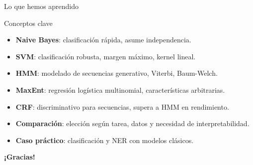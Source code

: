 \documentclass[aspectratio=169, 10pt, xcolor=table]{beamer}
\begin{document}
\begin{frame}{Lo que hemos aprendido}
    \begin{exampleblock}{Conceptos clave}
        \begin{itemize}
            \item \textbf{Naive Bayes}: clasificación rápida, asume independencia.
            \item \textbf{SVM}: clasificación robusta, margen máximo, kernel lineal.
            \item \textbf{HMM}: modelado de secuencias generativo, Viterbi, Baum-Welch.
            \item \textbf{MaxEnt}: regresión logística multinomial, características arbitrarias.
            \item \textbf{CRF}: discriminativo para secuencias, supera a HMM en rendimiento.
            \item \textbf{Comparación}: elección según tarea, datos y necesidad de interpretabilidad.
            \item \textbf{Caso práctico}: clasificación y NER con modelos clásicos.
        \end{itemize}
    \end{exampleblock}
\end{frame}

\begin{frame}
    \centering
    \Huge \textbf{¡Gracias!}

\end{frame}
\end{document}
